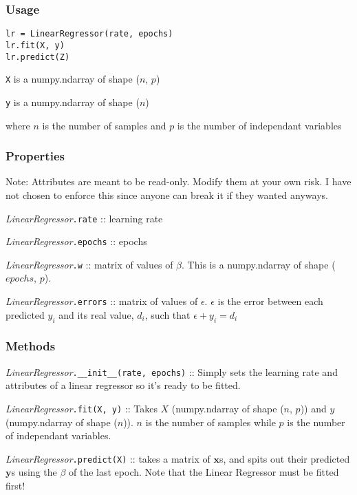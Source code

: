 \documentclass{article}
\begin{document}
\subsubsection{Usage}

\begin{verbatim}
lr = LinearRegressor(rate, epochs)
lr.fit(X, y)
lr.predict(Z)
\end{verbatim}

\texttt{X} is a numpy.ndarray of shape ($n$, $p$)

\texttt{y} is a numpy.ndarray of shape ($n$)

where $n$ is the number of samples and $p$ is the number of independant variables

\subsubsection{Properties}

Note: Attributes are meant to be read-only. Modify them at your own risk. I have not chosen to enforce this since anyone can break it if they wanted anyways.

\textit{LinearRegressor}\texttt{.rate} :: learning rate

\textit{LinearRegressor}\texttt{.epochs} :: epochs

\textit{LinearRegressor}\texttt{.w} :: matrix of values of $\beta$. This is a numpy.ndarray of shape ($epochs$, $p$).

\textit{LinearRegressor}\texttt{.errors} :: matrix of values of $\epsilon$. $\epsilon$ is the error between each predicted $y_i$ and its real value, $d_i$, such that $\epsilon + y_i = d_i$

\subsubsection{Methods}

\textit{LinearRegressor}\texttt{.\_\_init\_\_(rate, epochs)} :: Simply sets the learning rate and attributes of a linear regressor so it's ready to be fitted.

\textit{LinearRegressor}\texttt{.fit(X, y)} :: Takes $X$ (numpy.ndarray of shape ($n$, $p$)) and $y$ (numpy.ndarray of shape ($n$)). $n$ is the number of samples while $p$ is the number of independant variables.

\textit{LinearRegressor}\texttt{.predict(X)} :: takes a matrix of $\mathbf{x}$s, and spits out their predicted $\textbf{y}$s using the $\beta$ of the last epoch. Note that the Linear Regressor must be fitted first!
\end{document}
